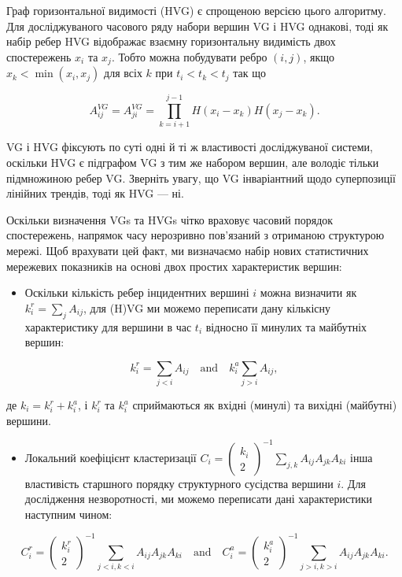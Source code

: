 \documentclass[
  letterpaper,
]{report}
\providecommand{\tightlist}{%
  \setlength{\itemsep}{0pt}\setlength{\parskip}{0pt}}\usepackage{longtable,booktabs,array}
\begin{document}
Граф горизонтальної видимості (HVG) є спрощеною версією цього алгоритму.
Для досліджуваного часового ряду набори вершин VG і HVG однакові, тоді
як набір ребер HVG відображає взаємну горизонтальну видимість двох
спостережень \(x_{i}\) та \(x_{j}\). Тобто можна побудувати ребро
\((i,j)\), якщо \(x_{k} < \min(x_{i}, x_{j})\) для всіх \(k\) при
\(t_{i} < t_{k} < t_{j}\) так що

\[ 
A_{ij}^{VG} = A_{ji}^{VG} = \prod_{k=i+1}^{j-1} H \left( x_{i} - x_{k} \right) H \left( x_{j} - x_{k} \right). 
\]

VG і HVG фіксують по суті одні й ті ж властивості досліджуваної системи,
оскільки HVG є підграфом VG з тим же набором вершин, але володіє тільки
підмножиною ребер VG. Зверніть увагу, що VG інваріантний щодо
суперпозиції лінійних трендів, тоді як HVG --- ні.

Оскільки визначення VGs та HVGs чітко враховує часовий порядок
спостережень, напрямок часу нерозривно пов'язаний з отриманою структурою
мережі. Щоб врахувати цей факт, ми визначаємо набір нових статистичних
мережевих показників на основі двох простих характеристик вершин:

\begin{itemize}
\tightlist
\item
  Оскільки кількість ребер інцидентних вершині \(i\) можна визначити як
  \(k_{i}^{r} = \sum_{j} A_{ij}\), для (H)VG ми можемо переписати дану
  кількісну характеристику для вершини в час \(t_{i}\) відносно її
  минулих та майбутніх вершин:
\end{itemize}

\[ 
k_{i}^{r} = \sum_{j<i} A_{ij} \quad \mathrm{and} \quad k_{i}^{a} \sum_{j>i} A_{ij}, 
\]

де \(k_{i} = k_{i}^{r} + k_{i}^{a}\), і \(k_{i}^{r}\) та \(k_{i}^{a}\)
сприймаються як вхідні (минулі) та вихідні (майбутні) вершини.

\begin{itemize}
\tightlist
\item
  Локальний коефіцієнт кластеризації
  \(C_{i} = \left( \begin{matrix} k_{i}\\ 2 \end{matrix} \right)^{-1} \sum_{j,k} A_{ij}A_{jk}A_{ki}\)
  інша властивість старшного порядку структурного сусідства вершини
  \(i\). Для дослідження незворотності, ми можемо переписати дані
  характеристики наступним чином:
\end{itemize}

\[ 
C_{i}^{r} = \left( \begin{matrix} k_{i}^{r}\\ 2 \end{matrix} \right)^{-1} \sum_{j<i,k<i} A_{ij}A_{jk}A_{ki} \quad \textrm{and} \quad C_{i}^{a} = \left( \begin{matrix} k_{i}^{a}\\ 2 \end{matrix} \right)^{-1} \sum_{j>i,k>i} A_{ij}A_{jk}A_{ki}. 
\]
\end{document}
